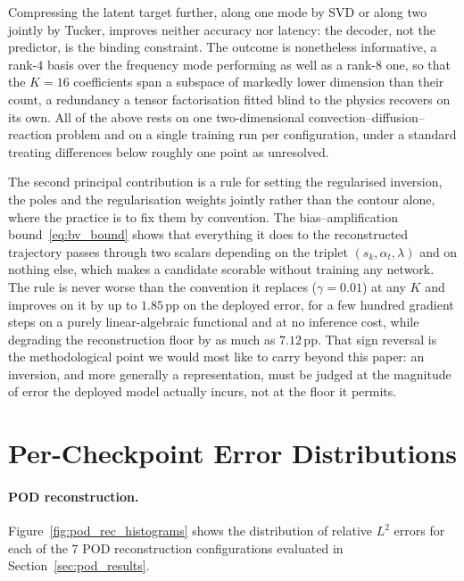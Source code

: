 ﻿\documentclass[a4paper,12pt]{article}
\theoremstyle{definition}
\theoremstyle{remark}
\begin{document}
Compressing the latent target further, along one mode by SVD or along two jointly by Tucker, improves neither accuracy nor latency: the decoder, not the predictor, is the binding constraint. The outcome is nonetheless informative, a rank-$4$ basis over the frequency mode performing as well as a rank-$8$ one, so that the $K = 16$ coefficients span a subspace of markedly lower dimension than their count, a redundancy a tensor factorisation fitted blind to the physics recovers on its own. All of the above rests on one two-dimensional convection--diffusion--reaction problem and on a single training run per configuration, under a standard treating differences below roughly one point as unresolved.

The second principal contribution is a rule for setting the regularised inversion, the poles and the regularisation weights jointly rather than the contour alone, where the practice is to fix them by convention. The bias--amplification bound~\eqref{eq:bv_bound} shows that everything it does to the reconstructed trajectory passes through two scalars depending on the triplet $(s_k, \alpha_t, \lambda)$ and on nothing else, which makes a candidate scorable without training any network. The rule is never worse than the convention it replaces ($\gamma = 0.01$) at any $K$ and improves on it by up to $1.85$\,pp on the deployed error, for a few hundred gradient steps on a purely linear-algebraic functional and at no inference cost, while degrading the reconstruction floor by as much as $7.12$\,pp. That sign reversal is the methodological point we would most like to carry beyond this paper: an inversion, and more generally a representation, must be judged at the magnitude of error the deployed model actually incurs, not at the floor it permits.

\newpage
{}
{}



\newpage
{}
{}

\clearpage
\appendix

\section{Per-Checkpoint Error Distributions}
\label{app:histograms}

\paragraph{POD reconstruction.} Figure~\ref{fig:pod_rec_histograms} shows the distribution of relative $L^2$ errors for each of the 7 POD reconstruction configurations evaluated in Section~\ref{sec:pod_results}.
\end{document}
